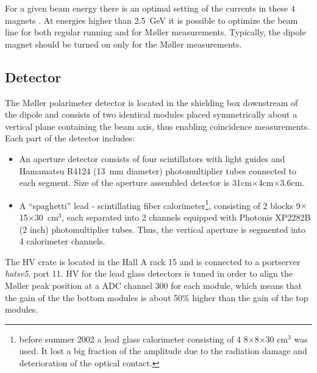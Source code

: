 {For a given beam energy there is an optimal setting of the currents in 
these 4 magnets%
.
At energies higher than 2.5~GeV it is possible
to optimize the beam line for both regular running and for 
M{\o}ller measurements. Typically, the dipole magnet should be turned on
only for the M{\o}ller measurements. 

\subsection {Detector}
\label{sec:moller_compon_det}

The M{\o}ller polarimeter detector is located in the shielding box downstream 
of the dipole and consists of two identical modules placed symmetrically about a vertical
plane containing the beam axis, thus enabling   
coincidence measurements.
Each part of the detector includes:
\begin{itemize}
 \item An aperture detector consists of four scintillators with light guides and 
       Hamamatsu R4124 (13~mm diameter) photomultiplier tubes connected to each segment. 
       Size of the aperture assembled detector is 31cm$\times$4cm$\times$3.6cm.
  \item A ``spaghetti'' lead - scintillating fiber calorimeter\footnote{
         before summer 2002 a lead glass calorimeter consisting of 4 
         8$\times$8$\times$30 cm$^3$
         was used. It lost a big fraction of the amplitude due
         to the radiation damage and deterioration of the optical contact.},
        consisting of 2 blocks 9$\times$15$\times$30~cm$^3$, each separated into 2
        channels equipped with Photonis XP2282B (2 inch) photomultiplier tubes. Thus,
        the vertical aperture is segmented into 4 calorimeter channels.
\end{itemize}
The HV crate is located in the Hall A rack 15 and is connected
to a portserver {\em hatsv5}, port 11.
HV for the lead glass detectors is tuned in order to align the M{\o}ller peak
position at a ADC channel 300 for each module, which means that the gain
of the the bottom modules is about 50\% higher than the gain of the top
modules.

}
